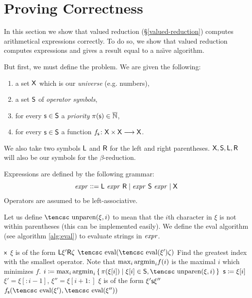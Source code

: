 \documentclass{llncs}
\newcounter{algo}
\begin{document}
\section{Proving Correctness}

\def\eval{\hbox{\tencsc eval}}
\def\unparen{\hbox{\tencsc unparen}}

In this section we show that valued reduction (\S\ref{valued-reduction}) computes arithmetical expressions correctly.
To do so, we show that valued reduction computes expressions and gives a result equal to a na\"\i ve algorithm.

But first, we must define the problem.
We are given the following:
\begin{enumerate}
    \item a set $\mathsf{X}$ which is our \textit{universe} (e.g. numbers),
    \item a set $\mathsf{S}$ of \textit{operator symbols},
    \item for every $\mathsf{s}\in\mathsf{S}$ a \textit{priority} $\pi(\mathsf{s})\in\overline{\mathbb N}$,
    \item for every $\mathsf{s}\in\mathsf{S}$ a function $f_{\mathsf{s}}\colon\mathsf{X}\times\mathsf{X}\longrightarrow\mathsf{X}$.
\end{enumerate}
We also take two symbols $\mathsf{L}$ and $\mathsf{R}$ for the left and right parentheses.
$\mathsf{X},\mathsf{S},\mathsf{L},\mathsf{R}$ will also be our symbols for the $\beta$-reduction.

Expressions are defined by the following grammar:
\[ {\it expr} \mathrel{{\mathop:}{\mathop:}{=}} \mathsf{L}\ {\it expr}\ \mathsf{R}  \mid {\it expr}\ \mathsf{S}\ {\it expr} \mid \mathsf{X} \]
Operators are assumed to be left-associative.

Let us define $\unparen(\xi,i)$ to mean that the $i$th character in $\xi$ is not within parentheses (this can be implemented easily).
We define the \eval{} algorithm (see algorithm \ref{alg:eval}) to evaluate strings in ${\it expr}$.

\begin{algo}
\algorithm
{}
        \State\Return $\mathsf{x}$
        \State $\xi$ is of the form $\mathsf{L}\xi'\mathsf{R}\zeta$
        \State\Return $\eval(\eval(\xi')\zeta)$
    \Else
        \Comment Find the greatest index with the smallest operator.\cr
        Note that $\max_i{\rm argmin}_if(i)$ is the maximal $i$ which minimizes $f$.\EndComment
        \State $i\coloneqq\max_i{\rm argmin}_i\set{\pi(\xi[i])}[{\xi[i]\in\s S,\unparen(\xi,i)}]$
        \State $\mathsf{s}\coloneqq\xi[i]$
        \Comment $\xi'=\xi[:i-1]$, $\xi''=\xi[i+1:]$ \EndComment
        \State $\xi$ is of the form $\xi'\mathsf{s}\xi''$
        \State\Return $f_{\s s}(\eval(\xi'),\eval(\xi''))$
    \EndIf
\EndFunc
\ealgorithm
\caption{\eval uating arithmetical expressions}
\label{alg:eval}
\end{algo}
\end{document}
